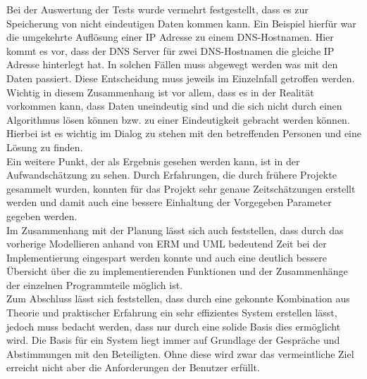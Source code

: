 Bei der Auswertung der Tests wurde vermehrt festgestellt, dass es zur Speicherung von nicht eindeutigen Daten kommen kann. Ein Beispiel hierfür war die umgekehrte Auflösung einer IP Adresse zu einem DNS-Hostnamen. Hier kommt es vor, dass der DNS Server für zwei DNS-Hostnamen die gleiche IP Adresse hinterlegt hat. In solchen Fällen muss abgewegt werden was mit den Daten passiert. Diese Entscheidung muss jeweils im Einzelnfall getroffen werden. Wichtig in diesem Zusammenhang ist vor allem, dass es in der Realität vorkommen kann, dass Daten uneindeutig sind und die sich nicht durch einen Algorithmus lösen können bzw. zu einer Eindeutigkeit gebracht werden können. Hierbei ist es wichtig im Dialog zu stehen mit den betreffenden Personen und eine Lösung zu finden.\\
Ein weitere Punkt, der als Ergebnis gesehen werden kann, ist in der Aufwandschätzung zu sehen. Durch Erfahrungen, die durch frühere Projekte gesammelt wurden, konnten für das Projekt sehr genaue Zeitschätzungen erstellt werden und damit auch eine bessere Einhaltung der Vorgegeben Parameter gegeben werden.\\
Im Zusammenhang mit der Planung lässt sich auch feststellen, dass durch das vorherige Modellieren anhand von ERM und UML bedeutend Zeit bei der Implementierung eingespart werden konnte und auch eine deutlich bessere Übersicht über die zu implementierenden Funktionen und der Zusammenhänge der einzelnen Programmteile möglich ist.\\
Zum Abschluss lässt sich feststellen, dass durch eine gekonnte Kombination aus Theorie und praktischer Erfahrung ein sehr effizientes System erstellen lässt, jedoch muss bedacht werden, dass nur durch eine solide Basis dies ermöglicht wird. Die Basis für ein System liegt immer auf Grundlage der Gespräche und Abstimmungen mit den Beteiligten. Ohne diese wird zwar das vermeintliche Ziel erreicht nicht aber die Anforderungen der Benutzer erfüllt.